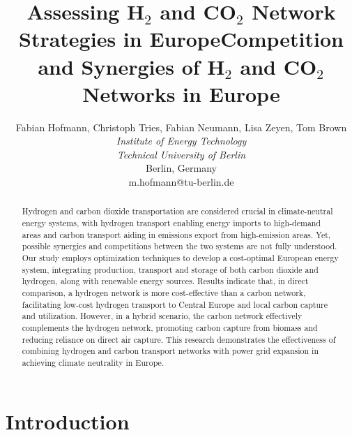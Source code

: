\documentclass[twocolumn]{article}
\newcommand{\COtwo}{CO$_2$}
\newcommand{\Htwo}{H$_2$}
\begin{document}

\title{Assessing \Htwo{} and \COtwo{} Network Strategies in Europe}
\title{Competition and Synergies of \Htwo{} and \COtwo{} Networks in Europe}



\author{
    Fabian Hofmann, Christoph Tries, Fabian Neumann, Lisa Zeyen, Tom Brown \\
    \textit{Institute of Energy Technology} \\
    \textit{Technical University of Berlin}\\
    Berlin, Germany \\
    m.hofmann@tu-berlin.de
}


\maketitle

\begin{abstract}
    Hydrogen and carbon dioxide transportation are considered crucial in climate-neutral energy systems, with hydrogen transport enabling energy imports to high-demand areas and carbon transport aiding in emissions export from high-emission areas. Yet, possible synergies and competitions between the two systems are not fully understood. Our study employs optimization techniques to develop a cost-optimal European energy system, integrating production, transport and storage of both carbon dioxide and hydrogen, along with renewable energy sources. Results indicate that, in direct comparison, a hydrogen network is more cost-effective than a carbon network, facilitating low-cost hydrogen transport to Central Europe and local carbon capture and utilization. However, in a hybrid scenario, the carbon network effectively complements the hydrogen network, promoting carbon capture from biomass and reducing reliance on direct air capture. This research demonstrates the effectiveness of combining hydrogen and carbon transport networks with power grid expansion in achieving climate neutrality in Europe.
\end{abstract}

\section{Introduction}
\end{document}
